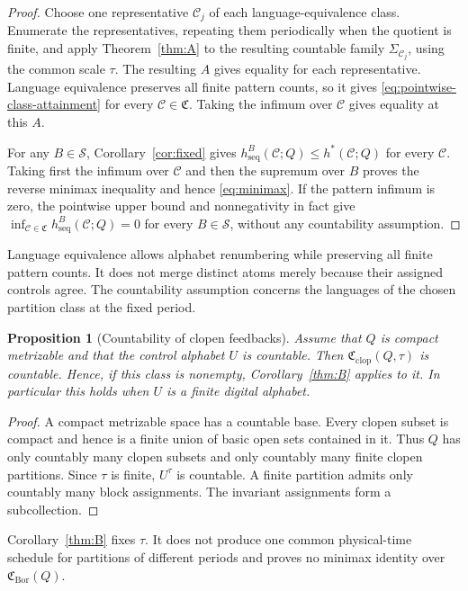 \documentclass[11pt,reqno]{amsart}
\numberwithin{equation}{section}
\newtheorem{proposition}[theorem]{Proposition}
\theoremstyle{definition}
\theoremstyle{definition}
\newcommand{\C}{\mathcal C}
\newcommand{\hseq}{h_{\mathrm{seq}}}
\newcommand{\hpat}{h^{*}}
\newcommand{\Bor}{\mathrm{Bor}}
\newcommand{\clop}{\mathrm{clop}}
\begin{document}
\begin{proof}
Choose one representative $\C_j$ of each language-equivalence class.
Enumerate the representatives, repeating them periodically when the quotient
is finite, and apply Theorem~\ref{thm:A} to the resulting countable family
$\Sigma_{\C_j}$, using the common scale $\tau$.  The resulting $A$ gives equality for each
representative.  Language equivalence preserves all finite pattern counts, so
it gives \eqref{eq:pointwise-class-attainment} for every $\C\in\mathfrak C$.
Taking the infimum over $\C$ gives equality at this $A$.

For any $B\in\mathscr S$, Corollary~\ref{cor:fixed} gives
$\hseq^B(\C;Q)\le\hpat(\C;Q)$ for every $\C$.  Taking first the infimum over
$\C$ and then the supremum over $B$ proves the reverse minimax inequality and
hence \eqref{eq:minimax}.  If the pattern infimum is zero, the pointwise upper
bound and nonnegativity in fact give
$\inf_{\C\in\mathfrak C}\hseq^B(\C;Q)=0$ for every $B\in\mathscr S$, without
any countability assumption.
\end{proof}

Language equivalence allows alphabet renumbering while preserving all
finite pattern counts. It does not merge distinct atoms merely because
their assigned controls agree. The countability assumption concerns
the languages of the chosen partition class at the fixed period.

\begin{proposition}[Countability of clopen feedbacks]
\label{prop:digital}
Assume that $Q$ is compact metrizable and that the control alphabet $U$ is
countable.  Then
$\mathfrak C_{\clop}(Q,\tau)$ is countable.  Hence, if this class is nonempty,
Corollary~\ref{thm:B} applies to it.  In particular this holds when $U$ is a
finite digital alphabet.
\end{proposition}

\begin{proof}
A compact metrizable space has a countable base.  Every clopen subset is
compact and hence is a finite union of basic open sets contained in it.  Thus
$Q$ has only countably many clopen subsets and only countably many finite
clopen partitions.  Since $\tau$ is finite, $U^\tau$ is countable.  A finite
partition admits only countably many block assignments.  The invariant assignments form a
subcollection.
\end{proof}

Corollary~\ref{thm:B} fixes $\tau$.  It does not produce one common
physical-time schedule for partitions of different periods and proves no
minimax identity over $\mathfrak C_{\Bor}(Q)$.
\end{document}
